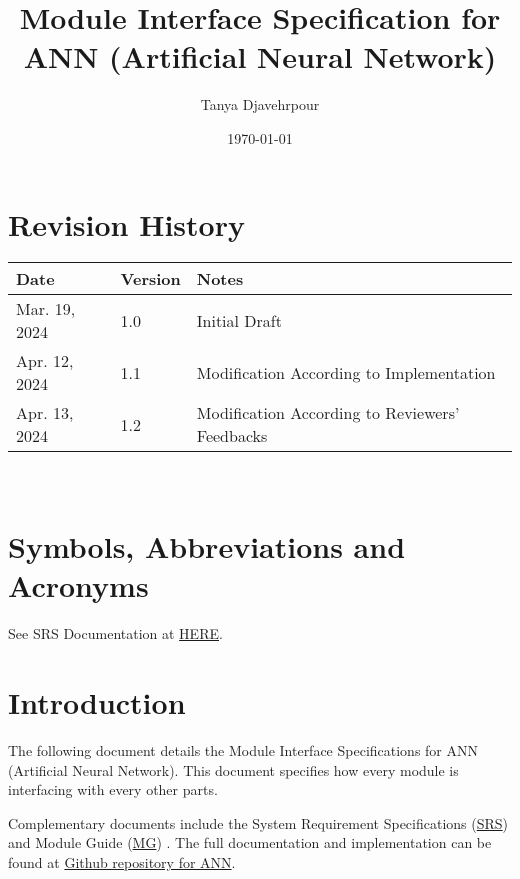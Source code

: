 \documentclass[12pt, titlepage]{article}
\begin{document}
\title{Module Interface Specification for ANN (Artificial Neural Network)}

\author{Tanya Djavehrpour}

\date{\today}

\maketitle


\section{Revision History}

\begin{tabularx}{\textwidth}{p{3cm}p{2cm}X}
\toprule {\bf Date} & {\bf Version} & {\bf Notes}\\
\midrule
Mar. 19, 2024 & 1.0 & Initial Draft\\
Apr. 12, 2024 & 1.1 & Modification According to Implementation\\
Apr. 13, 2024 & 1.2 & Modification According to Reviewers' Feedbacks\\
\bottomrule
\end{tabularx}

~\newpage

\section{Symbols, Abbreviations and Acronyms}

See SRS Documentation \cite{SRS} at \href{https://github.com/tanya-jp/ANN-CAS741/blob/main/docs/SRS/SRS.pdf}{HERE}.

\newpage

\tableofcontents

\newpage


\section{Introduction}

The following document details the Module Interface Specifications for
ANN (Artificial Neural Network). This document specifies how every module 
is interfacing with every other parts.

Complementary documents include the System Requirement Specifications 
(\href{https://github.com/tanya-jp/ANN-CAS741/blob/main/docs/SRS/SRS.pdf}{SRS}) \cite{SRS}
and Module Guide (\href{https://github.com/tanya-jp/ANN-CAS741/blob/main/docs/Design/SoftArchitecture/MG.pdf}{MG}) \cite{MG}.  
The full documentation and implementation can be
found at \href{https://github.com/tanya-jp/ANN-CAS741/tree/main}{Github repository for ANN}.
\end{document}

